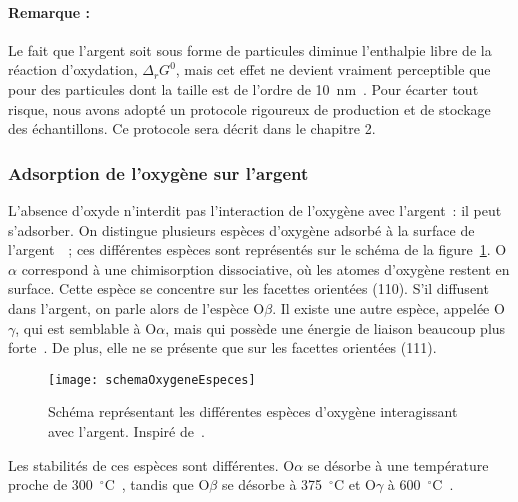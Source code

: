 \paragraph*{Remarque :} Le fait que l'argent soit sous forme de particules diminue l'enthalpie libre de la réaction d'oxydation, $\Delta_rG^0$, mais cet effet ne devient vraiment perceptible que pour des particules dont la taille est de l'ordre de 10~nm~\cite{levard2012environmental, campbell2006transition}. Pour écarter tout risque, nous avons adopté un protocole rigoureux de production et de stockage des échantillons. Ce protocole sera décrit dans le chapitre 2.\par 




		\subsubsection{Adsorption de l'oxygène sur l'argent}
L'absence d'oxyde n'interdit pas l'interaction de l'oxygène avec l'argent~: il peut s'adsorber. On distingue plusieurs espèces d'oxygène adsorbé à la surface de l'argent~\cite{nagy1999correlation}~; ces différentes espèces sont représentés sur le schéma de la figure~\ref{schemaOxygeneEspeces}. O$\alpha$ correspond à une chimisorption dissociative, où les atomes d'oxygène restent en surface. Cette espèce se concentre sur les facettes orientées (110). S'il diffusent dans l'argent, on parle alors de l'espèce O$\beta$. Il existe une autre espèce, appelée O$\gamma$, qui est semblable à O$\alpha$, mais qui possède une énergie de liaison beaucoup plus forte~\cite{bao1996interaction}. De plus, elle ne se présente que sur les facettes orientées (111).\par 
\begin{figure}[!htb]
	\centering
	\texttt{[image: schemaOxygeneEspeces]}
	\caption{Schéma représentant les différentes espèces d'oxygène interagissant avec l'argent. Inspiré de~\cite{nagy1999correlation}.}
	\label{schemaOxygeneEspeces}
\end{figure}
Les stabilités de ces espèces sont différentes. O$\alpha$ se désorbe à une température proche de 300~$^\circ$C~\cite{engelhardt1976adsorption}, tandis que O$\beta$ se désorbe à 375~$^\circ$C et O$\gamma$ à 600~$^\circ$C~\cite{nagy1999correlation}.\par 

